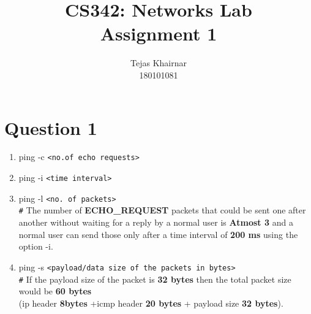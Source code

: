 \documentclass[a4paper,11pt]{article}
\title{CS342: Networks Lab \\ Assignment 1}
\author{Tejas Khairnar\\180101081}
\begin{document}
\maketitle

\section*{Question 1}
\begin{enumerate}[itemsep=-3pt,label=(\alph*)]
	\item ping -c \verb|<no.of echo requests>|
	\item ping -i \verb|<time interval>|
	\item ping -l \verb|<no. of packets>| \\
	\verb|#| The number of \textbf{ECHO\_REQUEST} packets that could be sent one after another without waiting for a reply by a normal user is\textbf{ Atmost 3} and a normal user can send those only after a time interval of \textbf{200 ms} using the option -i.
	\item ping -s \verb|<payload/data size of the packets in bytes>|\\
	\verb|#| If the payload size of the packet is \textbf{32 bytes} then the total packet size would be \textbf{60 bytes}\\ (ip header \textbf{8bytes} +icmp header \textbf{20 bytes} + payload size \textbf{32 bytes}).
\end{enumerate}
\end{document}
